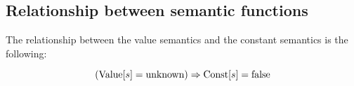 \documentclass{article}
\begin{document}

\subsection{Relationship between semantic functions}

The relationship between the value semantics and the constant
semantics is the following:

\[(\textrm{Value}[s] = \textrm{unknown}) \Rightarrow \textrm{Const}[s] = \textrm{false}\]
\end{document}
